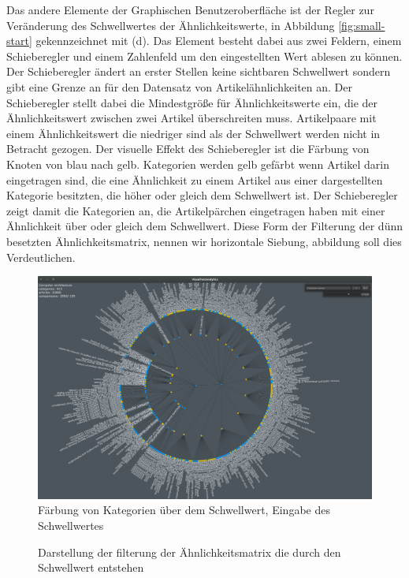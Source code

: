Das andere Elemente der Graphischen Benutzeroberfläche ist der Regler zur Veränderung des Schwellwertes der Ähnlichkeitswerte, in Abbildung \ref{fig:small-start} gekennzeichnet mit (d).
Das Element besteht dabei aus zwei Feldern, einem Schieberegler und einem Zahlenfeld um den eingestellten Wert ablesen zu können.
Der Schieberegler ändert an erster Stellen keine sichtbaren Schwellwert sondern gibt eine Grenze an für den Datensatz von Artikelähnlichkeiten an.
Der Schieberegler stellt dabei die Mindestgröße für Ähnlichkeitswerte ein, die der Ähnlichkeitswert zwischen zwei Artikel überschreiten muss.
Artikelpaare mit einem Ähnlichkeitswert die niedriger sind als der Schwellwert werden nicht in Betracht gezogen.
Der visuelle Effekt des Schieberegler ist die Färbung von Knoten von blau nach gelb.
Kategorien werden gelb gefärbt wenn Artikel darin eingetragen sind, die eine Ähnlichkeit zu einem Artikel aus einer dargestellten Kategorie besitzten, die höher oder gleich dem Schwellwert ist.
Der Schieberegler zeigt damit die Kategorien an, die Artikelpärchen eingetragen haben mit einer Ähnlichkeit über oder gleich dem Schwellwert.
Diese Form der Filterung der dünn besetzten Ähnlichkeitsmatrix, nennen wir horizontale Siebung, abbildung  soll dies Verdeutlichen.
\begin{figure}
    \centering
    \includegraphics[width=\textwidth]{images/threshold-7033-lvl3}
    \caption{Färbung von Kategorien über dem Schwellwert, Eingabe des Schwellwertes}
    \label{fig:threshold-cat}
\end{figure}

\begin{figure}
    \begin{tikzpicture}
    \end{tikzpicture}
    \caption{Darstellung der filterung der Ähnlichkeitsmatrix die durch den Schwellwert entstehen}
    \label{fig:simM-threshold-cat}
\end{figure}

